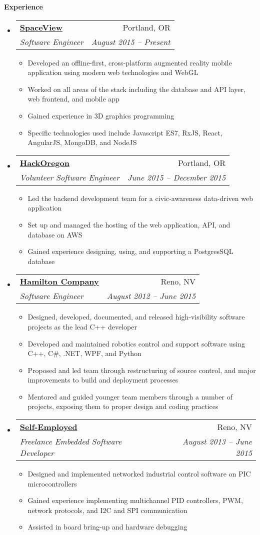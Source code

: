 \documentclass[letterpaper,11pt]{article}
\makeatletter
\newcommand{\resitem}[1]{\item #1 \vspace{-2pt}}
\newcommand{\resheading}[1]{{\normalsize \colorbox{mygrey}{\begin{minipage}{\textwidth}{\textbf{#1 \vphantom{p\^{E}}}}\end{minipage}}}}
\newcommand{\ressubheading}[4]{
\begin{tabular*}{6.5in}{l@{\extracolsep{\fill}}r}
		\textbf{#1} & #2 \\
		\textit{#3} & \textit{#4} \\
\end{tabular*}\vspace{-6pt}}
\makeatother
\begin{document}
\resheading{Experience}
	\begin{itemize}
		\item
			\ressubheading{\href{http://www.space.vu/}{SpaceView}}{Portland, OR}{Software Engineer}{August 2015 -- Present}
				{ \footnotesize
				\begin{itemize}
					\resitem{Developed an offline-first, cross-platform augmented reality mobile application using modern web technologies and WebGL}
                    \resitem{Worked on all areas of the stack including the database and API layer, web frontend, and mobile app}
                    \resitem{Gained experience in 3D graphics programming}
                    \resitem{Specific technologies used include Javascript ES7, RxJS, React, AngularJS, MongoDB, and NodeJS}
				\end{itemize}
				}
		\item
			\ressubheading{\href{http://www.hackoregon.org}{HackOregon}}{Portland, OR}{Volunteer Software Engineer}{June
            2015 -- December 2015}
				{ \footnotesize
				\begin{itemize}
					\resitem{Led the backend development team for a civic-awareness data-driven web application}
                    \resitem{Set up and managed the hosting of the web application, API, and database on AWS} 
                    \resitem{Gained experience designing, using, and supporting a PostgresSQL database}
				\end{itemize}
                }
			
		\item
			\ressubheading{\href{http://www.hamiltoncompany.com/}{Hamilton Company}}{Reno, NV}{Software Engineer}{August 2012 -- June 2015}
				{ \footnotesize
				\begin{itemize}
					\resitem{Designed, developed, documented, and released high-visibility software projects as the lead C++ developer}
					\resitem{Developed and maintained robotics control and support software using C++, C\#, .NET, WPF, and Python}
					\resitem{Proposed and led team through restructuring of source control, and major improvements to build and deployment processes}
					\resitem{Mentored and guided younger team members through a number of projects, exposing them to proper design and coding practices}
				\end{itemize}
				}

		\item
			\ressubheading{\href{https://www.linkedin.com/in/gferneyhough}{Self-Employed}}{Reno, NV}{Freelance Embedded Software Developer}{August 2013 -- June 2015}
				{ \footnotesize
				\begin{itemize}
					\resitem{Designed and implemented networked industrial control software on PIC microcontrollers}
					\resitem{Gained experience implementing multichannel PID controllers, PWM, network protocols, and I2C and SPI communication}
					\resitem{Assisted in board bring-up and hardware debugging}
				\end{itemize}
				}


\end{itemize}
\end{document}
